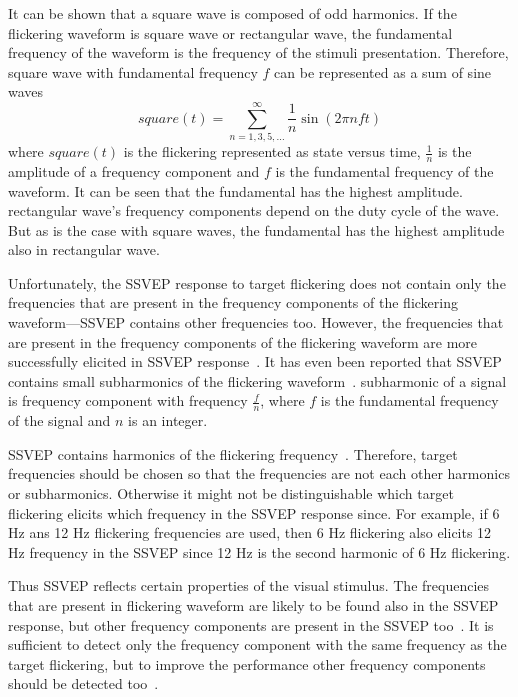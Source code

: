 It can be shown that a \gls{square wave} is composed of odd \glspl{harmonic}. If the \gls{flickering waveform} is \gls{square wave} or \gls{rectangular wave}, the \gls{fundamental} frequency of the waveform is the frequency of the stimuli presentation. Therefore, \gls{square wave} with \gls{fundamental} frequency $f$ can be represented as a sum of sine waves
\begin{equation}
	\label{eq:square}
	square(t) = \sum_{n=1,3,5,\dots}^{\infty}\frac{1}{n} \sin(2\pi nft)
\end{equation}
where $square(t)$ is the \gls{flickering} represented as \gls{state} versus time, $\frac{1}{n}$ is the amplitude of a \gls{frequency component} and $f$ is the \gls{fundamental} frequency of the waveform. It can be seen that the \gls{fundamental} has the highest amplitude. \Gls{rectangular wave}'s \glspl{frequency component} depend on the \gls{duty cycle} of the wave. But as is the case with \glspl{square wave}, the \gls{fundamental} has the highest amplitude also in \gls{rectangular wave}.

Unfortunately, the \gls{SSVEP} response to \gls{target} \gls{flickering} does not contain only the frequencies that are present in the \glspl{frequency component} of the \gls{flickering waveform}---\gls{SSVEP} contains other frequencies too. However, the frequencies that are present in the \glspl{frequency component} of the \gls{flickering waveform} are more successfully elicited in \gls{SSVEP} response~\cite{square_sine}. It has even been reported that \gls{SSVEP} contains small \glspl{subharmonic} of the \gls{flickering waveform}~\cite{ssvep_response}. \Gls{subharmonic} of a signal is \gls{frequency component} with frequency $\frac{f}{n}$, where $f$ is the \gls{fundamental} frequency of the signal and $n$ is an integer.

\gls{SSVEP} contains \glspl{harmonic} of the \gls{flickering} frequency~\cite{ssvep_response}. Therefore, \gls{target} frequencies should be chosen so that the frequencies are not each other \glspl{harmonic} or \glspl{subharmonic}. Otherwise it might not be distinguishable which \gls{target} \gls{flickering} elicits which frequency in the \gls{SSVEP} response since. For example, if 6 Hz ans 12 Hz \gls{flickering} frequencies are used, then 6 Hz \gls{flickering} also elicits 12 Hz frequency in the \gls{SSVEP} since 12 Hz is the second harmonic of 6 Hz \gls{flickering}.

Thus \gls{SSVEP} reflects certain properties of the visual stimulus. The frequencies that are present in \gls{flickering waveform} are likely to be found also in the \gls{SSVEP} response, but other \glspl{frequency component} are present in the \gls{SSVEP} too~\cite{square_sine}. It is sufficient to detect only the \gls{frequency component} with the same frequency as the \gls{target} \gls{flickering}, but to improve the performance other \glspl{frequency component} should be detected too~\cite{harmonic_imrpovement}.

